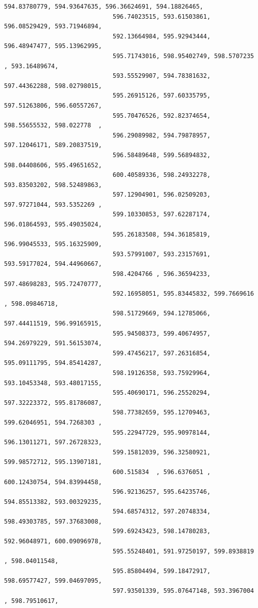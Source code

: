 \documentclass[11pt]{article}
\begin{document}
\begin{Verbatim}[commandchars=\\\{\}]
                              594.83780779, 594.93647635, 596.36624691, 594.18826465,
                              596.74023515, 593.61503861, 596.08529429, 593.71946894,
                              592.13664984, 595.92943444, 596.48947477, 595.13962995,
                              595.71743016, 598.95402749, 598.5707235 , 593.16489674,
                              593.55529907, 594.78381632, 597.44362288, 598.02798015,
                              595.26915126, 597.60335795, 597.51263806, 596.60557267,
                              595.70476526, 592.82374654, 598.55655532, 598.022778  ,
                              596.29089982, 594.79878957, 597.12046171, 589.20837519,
                              596.58489648, 599.56894832, 598.04408606, 595.49651652,
                              600.40589336, 598.24932278, 593.83503202, 598.52489863,
                              597.12904901, 596.02509203, 597.97271044, 593.5352269 ,
                              599.10330853, 597.62287174, 596.01864593, 595.49035024,
                              595.26183508, 594.36185819, 596.99045533, 595.16325909,
                              593.57991007, 593.23157691, 593.59177024, 594.44960667,
                              598.4204766 , 596.36594233, 597.48698283, 595.72470777,
                              592.16958051, 595.83445832, 599.7669616 , 598.09846718,
                              598.51729669, 594.12785066, 597.44411519, 596.99165915,
                              595.94508373, 599.40674957, 594.26979229, 591.56153074,
                              599.47456217, 597.26316854, 595.09111795, 594.85414287,
                              598.19126358, 593.75929964, 593.10453348, 593.48017155,
                              595.40690171, 596.25520294, 597.32223372, 595.81786087,
                              598.77382659, 595.12709463, 599.62046951, 594.7268303 ,
                              595.22947729, 595.90978144, 596.13011271, 597.26728323,
                              599.15812039, 596.32580921, 599.98572712, 595.13907181,
                              600.515834  , 596.6376051 , 600.12430754, 594.83994458,
                              596.92136257, 595.64235746, 594.85513382, 593.00329235,
                              594.68574312, 597.20748334, 598.49303785, 597.37683008,
                              599.69243423, 598.14780283, 592.96048971, 600.09096978,
                              595.55248401, 591.97250197, 599.8938819 , 598.04011548,
                              595.85804494, 599.18472917, 598.69577427, 599.04697095,
                              597.93501339, 595.07647148, 593.3967004 , 598.79510617,

\end{Verbatim}
\end{document}
